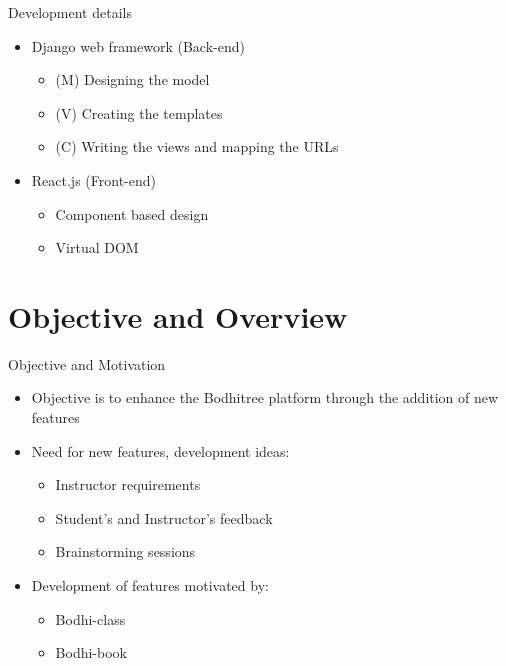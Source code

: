 \documentclass[xcolor=table]{beamer}
\begin{document}

\begin{frame}{Development details}
	\begin{itemize}
		\item Django web framework (Back-end)
		\begin{itemize}
			\item (M) Designing the model
			\item (V) Creating the templates
			\item (C) Writing the views and mapping the URLs
		\end{itemize}
		\vspace{0.2in}
		\item React.js (Front-end)
		\begin{itemize}
			\item Component based design
			\item Virtual DOM
		\end{itemize}
	\end{itemize}
\end{frame}

\section{Objective and Overview}


\begin{frame}{Objective and Motivation}
	\begin{itemize}
		\item Objective is to enhance the Bodhitree platform through the addition of new features
		\item Need for new features, development ideas:
		\begin{itemize}
			\item Instructor requirements
			\item Student's and Instructor's feedback
			\item Brainstorming sessions
		\end{itemize}
		\item Development of features motivated by:
		\begin{itemize}
			\item Bodhi-class
			\item Bodhi-book
		\end{itemize}
	\end{itemize}
\end{frame}
\end{document}
